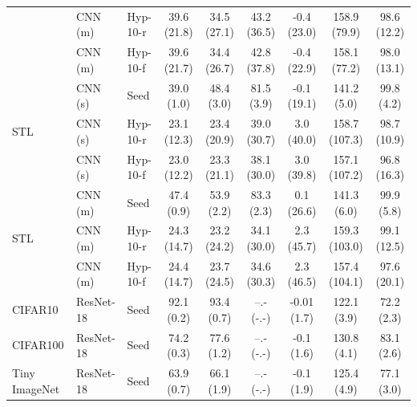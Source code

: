 \begin{table}[]
{{\begin{center}
\begin{tabular}{@{}lllcccccc@{}}
                               & CNN (m)   & Hyp-10-r   & 39.6 (21.8) & 34.5 (27.1)     & 43.2 (36.5)    & -0.4 (23.0) & 158.9 (79.9)  & 98.6 (12.2) \\
                               & CNN (m)   & Hyp-10-f    & 39.6 (21.7) & 34.4 (26.7)     & 42.8 (37.8)    & -0.4 (22.9) & 158.1 (77.2)  & 98.0 (13.1) \\
\cmidrule(r){1-1} \cmidrule(rl){2-2}  \cmidrule(rl){3-3} \cmidrule(rl){4-4} \cmidrule(rl){5-6} \cmidrule(rl){7-9}
\multirow{3}{*}{STL}           & CNN (s)   & Seed          & 39.0 (1.0)  & 48.4 (3.0)      & 81.5 (3.9)     & -0.1 (19.1) & 141.2 (5.0)   & 99.8 (4.2)  \\
                               & CNN (s)   & Hyp-10-r   & 23.1 (12.3) & 23.4 (20.9)     & 39.0 (30.7)    & 3.0 (40.0)  & 158.7 (107.3) & 98.7 (10.9) \\
                               & CNN (s)   & Hyp-10-f    & 23.0 (12.2) & 23.3 (21.1)     & 38.1 (30.0)    & 3.0 (39.8)  & 157.1 (107.2) & 96.8 (16.3) \\
\cmidrule(r){1-1} \cmidrule(rl){2-2}  \cmidrule(rl){3-3} \cmidrule(rl){4-4} \cmidrule(rl){5-6} \cmidrule(rl){7-9}
\multirow{3}{*}{STL}           & CNN (m)   & Seed          & 47.4 (0.9)  & 53.9 (2.2)      & 83.3 (2.3)     & 0.1 (26.6)  & 141.3 (6.0)   & 99.9 (5.8)  \\
                               & CNN (m)   & Hyp-10-r   & 24.3 (14.7) & 23.2 (24.2)     & 34.1 (30.0)    & 2.3 (45.7)  & 159.3 (103.0) & 99.1 (12.5) \\
                               & CNN (m)   & Hyp-10-f    & 24.4 (14.7) & 23.7 (24.5)     & 34.6 (30.3)    & 2.3 (46.5)  & 157.4 (104.1) & 97.6 (20.1) \\
\cmidrule(r){1-1} \cmidrule(rl){2-2}  \cmidrule(rl){3-3} \cmidrule(rl){4-4} \cmidrule(rl){5-6} \cmidrule(rl){7-9}
CIFAR10                       & ResNet-18     & Seed          & 92.1 (0.2)  & 93.4 (0.7)      & --.- (-.-)     & -0.01 (1.7)  & 122.1 (3.9)   & 72.2 (2.3)  \\
CIFAR100                      & ResNet-18     & Seed          & 74.2 (0.3)  & 77.6 (1.2) & --.- (-.-)  &  -0.1 (1.6) & 130.8 (4.1) & 83.1 (2.6)  \\
Tiny ImageNet                  & ResNet-18     & Seed         & 63.9 (0.7)  & 66.1 (1.9) &  --.- (-.-)  &  -0.1  (1.9)  & 125.4 (4.9) & 77.1 (3.0)  \\
\bottomrule
\end{tabular}
\end{center}
}
}

\end{table}



